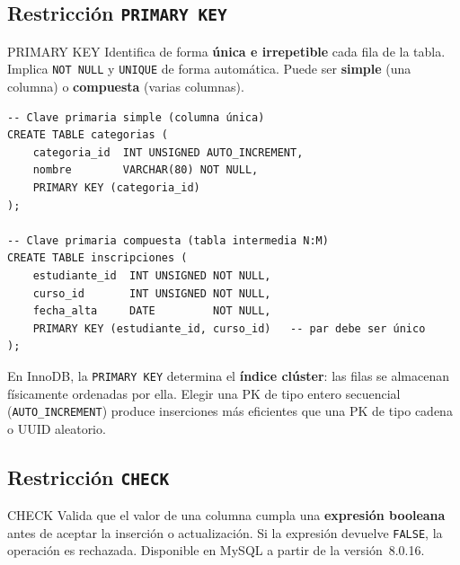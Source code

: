 \subsection{Restricción \texttt{PRIMARY KEY}}

\begin{definicion}{PRIMARY KEY}
  Identifica de forma \textbf{única e irrepetible} cada fila de la tabla.
  Implica \texttt{NOT NULL} y \texttt{UNIQUE} de forma automática. Puede
  ser \textbf{simple} (una columna) o \textbf{compuesta} (varias columnas).
\end{definicion}

\begin{lstlisting}[style=sql, caption={PK simple vs.\ PK compuesta}]
-- Clave primaria simple (columna única)
CREATE TABLE categorias (
    categoria_id  INT UNSIGNED AUTO_INCREMENT,
    nombre        VARCHAR(80) NOT NULL,
    PRIMARY KEY (categoria_id)
);

-- Clave primaria compuesta (tabla intermedia N:M)
CREATE TABLE inscripciones (
    estudiante_id  INT UNSIGNED NOT NULL,
    curso_id       INT UNSIGNED NOT NULL,
    fecha_alta     DATE         NOT NULL,
    PRIMARY KEY (estudiante_id, curso_id)   -- par debe ser único
);
\end{lstlisting}

\begin{nota}
  En InnoDB, la \texttt{PRIMARY KEY} determina el \textbf{índice clúster}:
  las filas se almacenan físicamente ordenadas por ella. Elegir una PK de
  tipo entero secuencial (\texttt{AUTO\_INCREMENT}) produce inserciones más
  eficientes que una PK de tipo cadena o UUID aleatorio.
\end{nota}

\subsection{Restricción \texttt{CHECK}}

\begin{definicion}{CHECK}
  Valida que el valor de una columna cumpla una \textbf{expresión booleana}
  antes de aceptar la inserción o actualización. Si la expresión devuelve
  \texttt{FALSE}, la operación es rechazada. Disponible en MySQL a partir
  de la versión~8.0.16.
\end{definicion}

